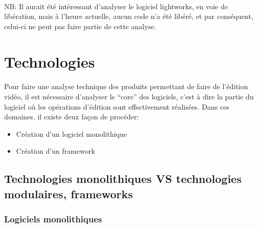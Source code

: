 \paragraph{}

NB: Il aurait été intéressant d'analyser le logiciel lightworks,
en voie de libération, mais à l'heure actuelle, aucun code n'a été
libéré, et par conséquent, celui-ci ne peut pas faire partie de
cette analyse.

\newpage

\section{Technologies}

\paragraph{}

Pour faire une analyse technique des produits permettant de faire
de l'édition vidéo, il est nécessaire d'analyser le ``core'' des
logiciels, c'est à dire la partie du logiciel où les opérations
d'édition sont effectivement réalisées. Dans ces domaines, il existe
deux façon de procéder:

\begin{itemize} \setlength{\itemsep}{2mm}

  \item{Création d'un logiciel monolithique}

  \item{Création d'un framework 
   }

\end{itemize}

\subsection {Technologies monolithiques VS
technologies modulaires, frameworks}


\subsubsection{Logiciels monolithiques }

